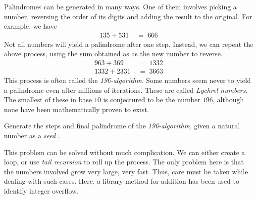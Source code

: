 

\problem Palindromes can be generated in many ways. One of them involves picking a number, reversing
the order of its digits and adding the result to the original. For example, we have
\begin{align*}
	135 + 531 \; &= \; 666
\end{align*}
Not all numbers will yield a palindrome after one step. Instead, we can repeat the above process, using the sum obtained as
as the new number to reverse.
\begin{align*}
	963 + 369   \; &= \; 1332 \\
	1332 + 2331 \; &= \; 3663
\end{align*}
This process is often called the \textit{196-algorithm}. 
Some numbers seem never to yield a palindrome even after millions of iterations. These are called \textit{Lychrel numbers}.
The smallest of these in base $10$ is conjectured to be the number $196$, although none have been mathematically proven to exist.

Generate the steps and final palindrome of the \textit{196-algorithm}, given a natural number as a \textit{seed \footnotemark}.


\solution
This problem can be solved without much complication. We can either create a loop, or use \textit{tail recursion \footnotemark} to roll
up the process. The only problem here is that the numbers involved grow very large, very fast. Thus, care must be taken while dealing
with such cases. Here, a library method for addition has been used to identify integer overflow.


